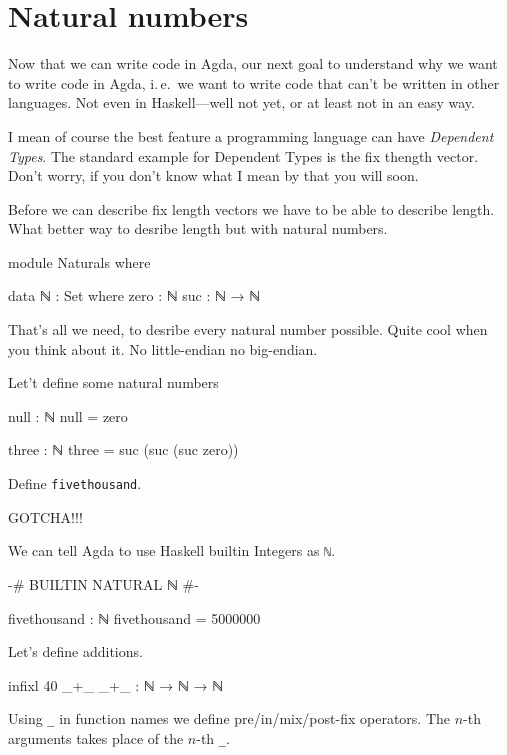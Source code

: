 \section{Natural numbers}
Now that we can write code in Agda, our next goal to understand why we
want to write code in Agda, i. e. we want to write code that can’t be
written in other languages. Not even in Haskell—well not yet, or at
least not in an easy way.

I mean of course the best feature a programming language can have
\emph{Dependent Types}. The standard example for Dependent Types is the
fix thength vector. Don’t worry, if you don’t know what I mean by that
you will soon.

Before we can describe fix length vectors we have to be able to describe
length. What better way to desribe length but with natural numbers.

\begin{code}
module Naturals where

data ℕ : Set where
  zero : ℕ
  suc : ℕ → ℕ
\end{code}

That's all we need, to desribe every natural number possible.
Quite cool when you think about it. No little-endian no big-endian.

Let't define some natural numbers

\begin{code}
null : ℕ
null = zero

three : ℕ
three = suc (suc (suc zero))
\end{code}

\begin{exercise}
  Define \verb+fivethousand+.
\end{exercise}

GOTCHA!!!

We can tell Agda to use Haskell builtin Integers as \verb+ℕ+.

\begin{code}
{-# BUILTIN NATURAL ℕ #-}

fivethousand : ℕ
fivethousand = 5000000
\end{code}

Let's define additions.

\begin{code}
infixl 40 _+_
_+_ : ℕ → ℕ → ℕ
\end{code}

Using \verb+_+ in function names we define pre/in/mix/post-fix operators. The
$n$-th arguments takes place of the $n$-th \verb+_+.

